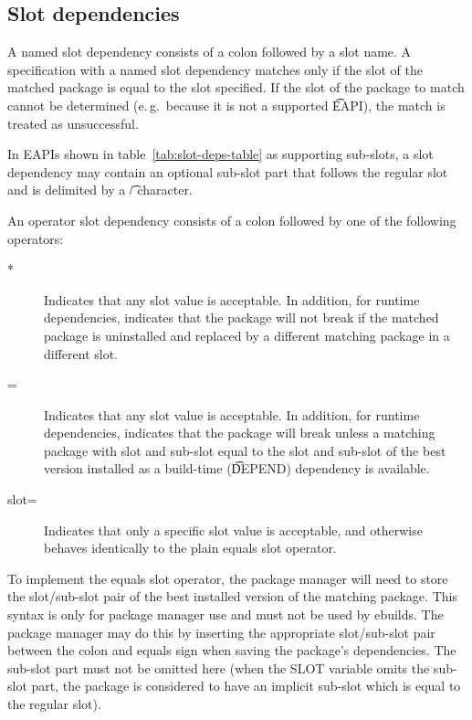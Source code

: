 \subsection{Slot dependencies}
\label{sec:slot-dep}

 A named slot dependency consists of a colon followed by a slot name. A
specification with a named slot dependency matches only if the slot of the matched package is equal
to the slot specified. If the slot of the package to match cannot be determined (e.\,g.\ because it
is not a supported \t{EAPI}), the match is treated as unsuccessful.

 In EAPIs shown in table~\ref{tab:slot-deps-table} as supporting sub-slots,
a slot dependency may contain an optional sub-slot part that follows the regular slot and is
delimited by a \t{/} character.

 An operator slot dependency consists of a colon followed by one of
the following operators:

\begin{description}
\item[*] Indicates that any slot value is acceptable. In addition, for runtime dependencies,
    indicates that the package will not break if the matched package is uninstalled and replaced by
    a different matching package in a different slot.
\item[=] Indicates that any slot value is acceptable. In addition, for runtime dependencies,
    indicates that the package will break unless a matching package with slot and sub-slot equal to
    the slot and sub-slot of the best version installed as a build-time (\t{DEPEND}) dependency is
    available.
\item[slot=] Indicates that only a specific slot value is acceptable, and otherwise behaves
    identically to the plain equals slot operator.
\end{description}

To implement the equals slot operator, the package manager will need to store the slot/sub-slot
pair of the best installed version of the matching package. This syntax is only for package manager
use and must not be used by ebuilds. The package manager may do this by inserting the appropriate
slot/sub-slot pair between the colon and equals sign when saving the package's dependencies. The
sub-slot part must not be omitted here (when the SLOT variable omits the sub-slot part, the package
is considered to have an implicit sub-slot which is equal to the regular slot).

